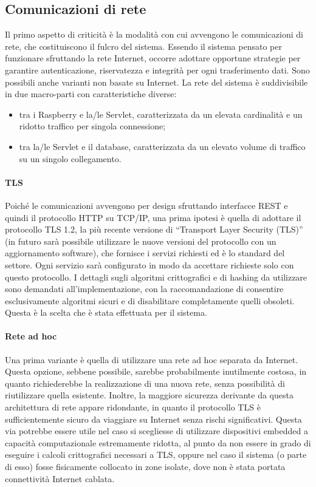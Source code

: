 \subsection{Comunicazioni di rete}
Il primo aspetto di criticità è la modalità con cui avvengono le comunicazioni di rete, che costituiscono il fulcro del sistema. Essendo il sistema pensato per funzionare sfruttando la rete Internet, occorre adottare opportune strategie per garantire autenticazione, riservatezza e integrità per ogni trasferimento dati. Sono possibili anche varianti non basate su Internet. La rete del sistema è suddivisibile in due macro-parti con caratteristiche diverse:
\begin{itemize}
 \item tra i Raspberry e la/le Servlet, caratterizzata da un elevata cardinalità e un ridotto traffico per singola connessione;
 \item tra la/le Servlet e il database, caratterizzata da un elevato volume di traffico su un singolo collegamento.
\end{itemize}
\paragraph{TLS}
Poiché le comunicazioni avvengono per design sfruttando interfacce REST e quindi il protocollo HTTP su TCP/IP, una prima ipotesi è quella di adottare il protocollo TLS 1.2, la più recente versione di ``Transport Layer Security (TLS)'' (in futuro sarà possibile utilizzare le nuove versioni del protocollo con un aggiornamento software), che fornisce i servizi richiesti ed è lo standard del settore. Ogni servizio sarà configurato in modo da accettare richieste solo con questo protocollo. I dettagli sugli algoritmi crittografici e di hashing da utilizzare sono demandati all'implementazione, con la raccomandazione di consentire esclusivamente algoritmi sicuri e di disabilitare completamente quelli obsoleti. Questa è la scelta che è stata effettuata per il sistema.
\paragraph{Rete ad hoc}
Una prima variante è quella di utilizzare una rete ad hoc separata da Internet. Questa opzione, sebbene possibile, sarebbe probabilmente inutilmente costosa, in quanto richiederebbe la realizzazione di una nuova rete, senza possibilità di riutilizzare quella esistente. Inoltre, la maggiore sicurezza derivante da questa architettura di rete appare ridondante, in quanto il protocollo TLS è sufficientemente sicuro da viaggiare su Internet senza rischi significativi. Questa via potrebbe essere utile nel caso si scegliesse di utilizzare dispositivi embedded a capacità computazionale estremamente ridotta, al punto da non essere in grado di eseguire i calcoli crittografici necessari a TLS, oppure nel caso il sistema (o parte di esso) fosse fisicamente collocato in zone isolate, dove non è stata portata connettività Internet cablata.
